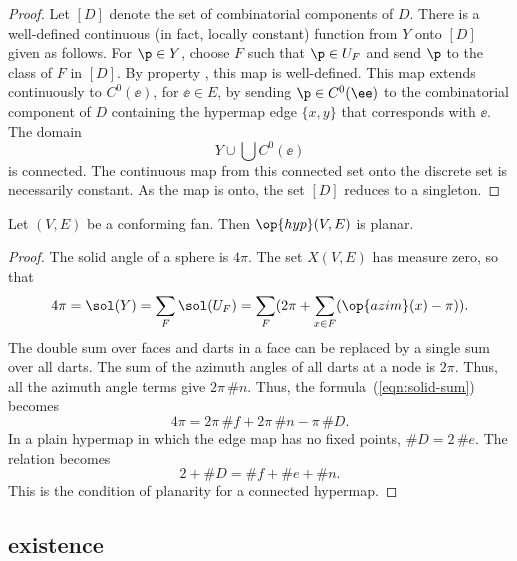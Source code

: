 \begin{proof} Let $[D]$ denote the set of combinatorial components of
$D$.  There is a well-defined continuous (in fact, locally constant)
function from $Y$ onto $[D]$ given as follows.  For $\p\in Y$,
choose $F$ such that $\p\in U_F$ and send $\p$ to the class of $F$
in $[D]$.  By property , this map is
well-defined. This map extends continuously to $C^0(\ee)$, for
$\ee\in E$, by sending $\p\in C^0(\ee)$ to the combinatorial
component of $D$ containing the hypermap edge $\{x,y\}$  that
corresponds with $\ee$.  The domain
\begin{displaymath}
Y\cup \bigcup C^0(\ee)
\end{displaymath}
is connected.  The continuous map from this connected set onto the
discrete set is necessarily constant.  As the map is onto, the set
$[D]$ reduces to a singleton.
\end{proof}

\begin{lemma}[]  
Let $(V,E)$ be a conforming fan.  
Then $\op{hyp}(V,E)$ is planar.
\end{lemma}
%
%

\begin{proof}  The solid angle of a sphere is $4\pi$.  The set $X(V,E)$
has measure zero, so that
\begin{equation}\label{eqn:solid-sum}
4\pi = \sol(Y)= \sum_F \sol(U_F) = 
\sum_F ( 2\pi + \sum_{x\in F} (\op{azim}(x)-\pi) ).
\end{equation}
The double sum over faces and darts in a face can be replaced by
a single sum over all darts.  
The sum of the azimuth angles of all darts at a node is $2\pi$. Thus,
all the azimuth angle terms give $2\pi\,\#n$.
Thus, the formula~(\ref{eqn:solid-sum}) becomes
\begin{displaymath}
4\pi = 2\pi\, \#f +2\pi\,\#n - \pi\, \#D.
\end{displaymath}
In a plain hypermap in which the edge map has no fixed points, $\#D =
2\,\#e$.  The relation becomes
\begin{displaymath}
2 + \#D = \#f + \#e + \#n.
\end{displaymath}
This is the condition of planarity for a connected hypermap.
\end{proof}
%

\subsection{existence}




